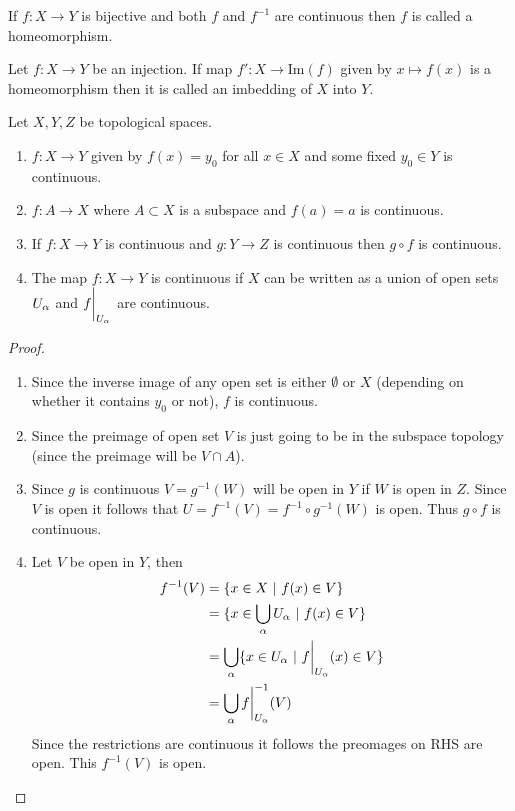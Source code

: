 \begin{definition}
  If $f:X\to Y$ is bijective and both $f$ and $f^{-1}$ are continuous then $f$ is called a homeomorphism.
\end{definition}
\begin{definition}
  Let $f:X\to Y$ be an injection. If map $f':X\to \text{Im}(f)$ given by $x\mapsto f(x)$ is a homeomorphism then it is called an imbedding of $X$ into $Y$.
\end{definition}
\begin{theorem}
  Let $X,Y,Z$ be topological spaces.
  \begin{enumerate}
    \item $f:X\to Y$ given by $f(x) = y_0$ for all $x\in X$ and some fixed $y_0\in Y$ is continuous.
    \item $f:A\to X$ where $A\subset X$ is a subspace and $f(a) =a$ is continuous.
    \item If $f:X\to Y$ is continuous and $g:Y\to Z$ is continuous then $g\circ f$ is continuous.
    \item The map $f:X\to Y$ is continuous if $X$ can be written as a union of open sets $U_\alpha$ and $f\bigg|_{U_\alpha}$ are continuous.
  \end{enumerate}
\end{theorem}
\begin{proof}
  \begin{enumerate}
    \item Since the inverse image of any open set is either $\emptyset$ or $X$ (depending on whether it contains $y_0$ or not), $f$ is continuous. 
    \item Since the preimage of open set $V$ is just going to be in the subspace topology (since the preimage will be $V\cap A$).
    \item Since $g$ is continuous $V = g^{-1}(W)$ will be open in $Y$ if $W$ is open in $Z$. Since $V$ is open it follows that $U = f^{-1}(V) = f^{-1}\circ g^{-1}(W)$ is open. Thus $g\circ f$ is continuous. 
    \item Let $V$ be open in $Y$, then 
      \begin{align*}
        f^{-1}(V) &= \{x\in X\ |\ f(x)\in V\}\\
               &= \{x\in \bigcup_\alpha U_\alpha\ |\ f(x)\in V\}\\
               &= \bigcup_\alpha \{x\in U_\alpha\ |\ f\bigg|_{U_\alpha} (x) \in V\}\\
               &= \bigcup_\alpha f\bigg|_{U_\alpha}^{-1}(V)\\
      \end{align*}
      Since the restrictions are continuous it follows the preomages on RHS are open. This $f^{-1}(V)$ is open.
  \end{enumerate}
\end{proof}
